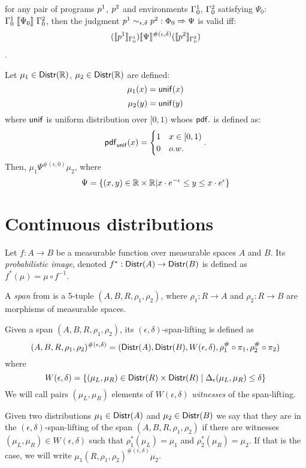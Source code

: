 \documentclass[a4paper,11pt]{article}
\begin{document}
\clearpage
\begin{thm}[Soundness]
for any pair of programs $p^1$, $p^2$ and environments $\Gamma^1_0$, $\Gamma^2_0$ 
satisfying $\Psi_0$: 
$\Gamma^1_0 ~ \llbracket \Psi_0 \rrbracket ~ \Gamma^2_0$, then the judgment  
$p^1	
\sim_{\epsilon, \delta} 
p^2 :
\Phi_0 \Rightarrow \Psi $ 
is valid iff: 
$$ 
(\llbracket p^1 \rrbracket_{\Gamma^1_0})  
\llbracket \Psi \rrbracket^{\#(\epsilon, \delta)} 
(\llbracket p^2 \rrbracket_{\Gamma^2_0}) 
$$.
\end{thm}



\begin{thm}
\label{corr_axunif}
Let $\mu_1 \in \mathsf{Distr}(\mathbb{R})$, $\mu_2 \in \mathsf{Distr}(\mathbb{R})$ are defined:
\[
	{\mu_1}(x) = \mathsf{unif}(x)
\]
\[
	{\mu_2}(y) = {\mathsf{unif}}(y)
\]
where $\mathsf{unif}$ is uniform distribution over $[0, 1)$ whoes $\mathsf{pdf}.$ is defined as:
\[
	\mathsf{pdf}_{\mathsf{unif}}(x) = 
	\begin{cases}
	1 & x \in [0, 1)\\
	0       & o.w.
	\end{cases}.
\]
Then, $\mu_1 \Psi^{\#(\epsilon, 0)} \mu_2$, where
\[
	\Psi = \{(x,y) \in \mathbb{R} \times \mathbb{R} | x \cdot e^{-\epsilon} \leq y \leq x \cdot e^{\epsilon} \}
\]
\end{thm}

\section{Continuous distributions}

\begin{defn}
  Let $f:A \to B$ be a measurable function over measurable spaces $A$ and $B$.
  Its \emph{probabilistic image}, denoted $f^*:\mathsf{Distr}(A)\to\mathsf{Distr}(B)$ is
  defined as $f^*(\mu)=\mu\circ f^{-1}$.   
\end{defn}


\begin{defn}
  A \emph{span} from is a 5-tuple $(A,B,R,\rho_1,\rho_2)$, where $\rho_1:R\to A$
  and $\rho_2: R \to B$ are morphisms of measurable spaces.
\end{defn}

\begin{defn}
  Given a span $(A,B,R,\rho_1,\rho_2)$, its
  $(\epsilon,\delta)$-span-lifting is defined as
  $$
  (A,B,R,\rho_1,\rho_2)^{\#(\epsilon,\delta)}=(\mathsf{Distr}(A),\mathsf{Distr}(B),W(\epsilon,\delta), \rho_1^\#\circ \pi_1, \rho_2^\#\circ \pi_2)
  $$
  where
  $$
  W(\epsilon, \delta)=\{(\mu_L,\mu_R)\in \mathsf{Distr}(R)\times\mathsf{Distr}(R)\mid \Delta_\epsilon(\mu_L,\mu_R)\leq \delta\}
  $$
  We will call pairs $(\mu_L,\mu_R)$ elements of $W(\epsilon, \delta)$
  \emph{witnesses} of the span-lifting.

  Given two distributions $\mu_1\in \mathsf{Distr}(A)$ and $\mu_2\in\mathsf{Distr}(B)$
  we say that they are in the $(\epsilon,\delta)$-span-lifting of the span
  $(A,B,R,\rho_1,\rho_2)$ if there are witnesses $(\mu_L,\mu_R)\in  W(\epsilon, \delta)$ such that $\rho_1^*(\mu_L)=\mu_1$ and $\rho_2^*(\mu_R)=\mu_2$.
If that is the case, we will write $\mu_1 (R,\rho_1,\rho_2)^{\#(\epsilon, \delta)} \mu_2$.  
\end{defn}
\end{document}
